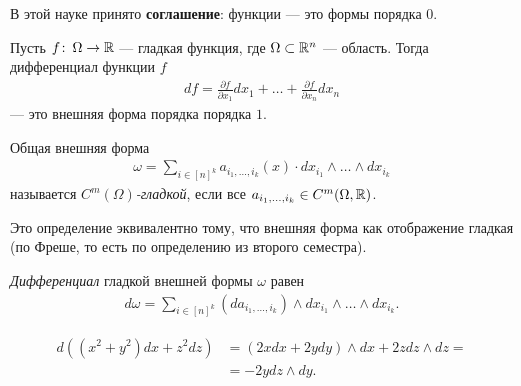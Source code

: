 В этой науке принято \textbf{соглашение}: функции --- это формы порядка $0$.

\begin{exmpl}
 Пусть $f \colon\, \Omega \to \mathbb{R}  $  --- гладкая функция, где $\Omega \subset \mathbb{R}^{n}$ --- область. Тогда дифференциал функции $f$
 \begin{align*}
  df = \frac{\partial f}{\partial x_1} dx_1 + \ldots + \frac{\partial f}{\partial x_n} dx_n
 \end{align*} --- это внешняя форма порядка порядка $1$.
\end{exmpl}
\begin{df}
 Общая внешняя форма 
\begin{align*}
 \omega = \sum_{i \in [n]^{k}} a_{i_1,\ldots,i_k}(x) \cdot dx_{i_1} \land \ldots \land dx_{i_k}
\end{align*} называется \textit{$C^{m}(\Omega)$-гладкой}, если все $a_{i_1, \ldots, i_k} \in C^{m}(\Omega, \mathbb{R})$.

Это определение эквивалентно тому, что внешняя форма как отображение гладкая (по Фреше, то есть по определению из второго семестра).
\end{df}
\begin{df}
 \textit{Дифференциал} гладкой внешней формы $\omega$ равен
 \begin{align*}
   d \omega = \sum_{i \in [n]^{k}} (d a_{i_1,\ldots,i_k}) \land dx_{i_1} \land \ldots \land dx_{i_k}
 .\end{align*} 
\end{df}
\begin{exmpl*}
 \begin{align*}
  d((x^{2} + y^{2})dx + z^{2}dz) &= (2x dx + 2y dy) \land dx + 2z dz \land dz = \\
  &= -2y dz \land dy
 .\end{align*} 
\end{exmpl*}

